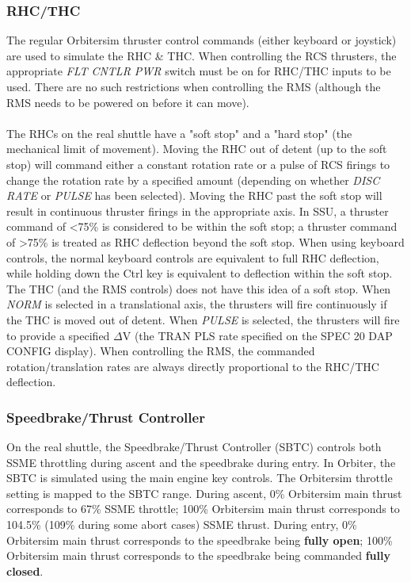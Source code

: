 \documentclass[13pt]{article}
\begin{document}
\begin{multicols*}{2}
\subsubsection{RHC/THC}
The regular Orbitersim thruster control commands (either keyboard or joystick) are used to simulate the RHC \& THC. When controlling the RCS thrusters, the appropriate \textit{FLT CNTLR PWR} switch must be on for RHC/THC inputs to be used. There are no such restrictions when controlling the RMS (although the RMS needs to be powered on before it can move).
\\
\\
The RHCs on the real shuttle have a "soft stop" and a "hard stop" (the mechanical limit of movement). Moving the RHC out of detent (up to the soft stop) will command either a constant rotation rate or a pulse of RCS firings to change the rotation rate by a specified amount (depending on whether \textit{DISC RATE} or \textit{PULSE} has been selected). Moving the RHC past the soft stop will result in continuous thruster firings in the appropriate axis. In SSU, a thruster command of <75\% is considered to be within the soft stop; a thruster command of >75\% is treated as RHC deflection beyond the soft stop. When using keyboard controls, the normal keyboard controls are equivalent to full RHC deflection, while holding down the Ctrl key is equivalent to deflection within the soft stop. The THC (and the RMS controls) does not have this idea of a soft stop. When \textit{NORM} is selected in a translational axis, the thrusters will fire continuously if the THC is moved out of detent. When \textit{PULSE} is selected, the thrusters will fire to provide a specified $\Delta$V (the TRAN PLS rate specified on the SPEC 20 DAP CONFIG display). When controlling the RMS, the commanded rotation/translation rates are always directly proportional to the RHC/THC deflection.

\subsubsection{Speedbrake/Thrust Controller}
On the real shuttle, the Speedbrake/Thrust Controller (SBTC) controls both SSME throttling during ascent and the speedbrake during entry. In Orbiter, the SBTC is simulated using the main engine key controls. The Orbitersim throttle setting is mapped to the SBTC range. During ascent, 0\% Orbitersim main thrust corresponds to 67\% SSME throttle; 100\% Orbitersim main thrust corresponds to 104.5\% (109\% during some abort cases) SSME thrust. During entry, 0\% Orbitersim main thrust corresponds to the speedbrake being \textbf{fully open}; 100\% Orbitersim main thrust corresponds to the speedbrake being commanded \textbf{fully closed}.


\end{multicols*}
\end{document}
